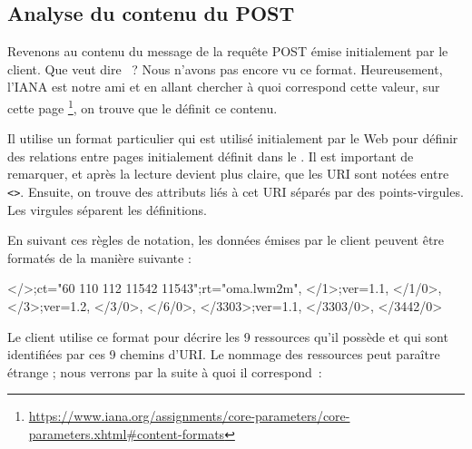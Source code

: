 \subsection{Analyse du contenu du POST}

Revenons au contenu du message de la requête POST émise initialement par le client. Que veut dire ~? Nous n'avons pas encore vu ce format. Heureusement, l'\ac{IANA} est notre ami et en allant chercher à quoi correspond cette valeur, sur cette page \footnote{\url{https://www.iana.org/assignments/core-parameters/core-parameters.xhtml\#content-formats}}, on trouve que le  définit ce contenu.

Il utilise un format particulier qui est utilisé initialement par le Web pour définir des relations entre pages initialement définit dans le . Il est important de remarquer, et après la lecture devient plus claire, que les URI sont notées entre \texttt{<>}. Ensuite, on trouve des attributs liés à cet URI séparés par des points-virgules. Les virgules séparent les définitions.

En suivant ces règles de notation, les données émises par le client peuvent être formatés de la manière suivante :

\begin{termc}[backgroundcolor=\color{purple!30}, basicstyle=\ttfamily\small, escapechar=@] %
</>;ct="60 110 112 11542 11543";rt="oma.lwm2m",
</1>;ver=1.1,
</1/0>,
</3>;ver=1.2,
</3/0>,
</6/0>,
</3303>;ver=1.1,
</3303/0>,
</3442/0>
\end{termc}

Le client utilise ce format pour décrire les 9 ressources qu'il possède et qui sont identifiées par ces 9 chemins d'URI. Le nommage des ressources peut paraître étrange ; nous verrons par la suite à quoi il correspond~:

